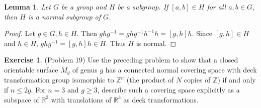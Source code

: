 \documentclass[12pt, psamsfonts]{amsart}
\newtheorem{lem}[thm]{Lemma}
\theoremstyle{definition}
\newtheorem*{exer}{Exercise}
\theoremstyle{remark}
\numberwithin{equation}{section}
\begin{document}
\begin{lem}
  Let $G$ be a group and $H$ be a subgroup.
  If $[a, b] \in H$ for all $a, b \in G$, then $H$ is a normal subgroup of $G$.
\end{lem}

\begin{proof}
  Let $g \in G, h \in H$.
  Then $ghg^{-1} = ghg^{-1}h^{-1}h = [g, h]h$.
  Since $[g, h] \in H$ and $h \in H$, $ghg^{-1} = [g, h]h \in H$.
  Thus $H$ is normal.
\end{proof}

\begin{exer}{(Problem 19)}
  Use the preceding problem to show that a closed orientable surface $M_g$ of genus $g$ has a connected normal covering space with deck transformation group isomorphic to $\mathbb{Z}^n$ (the product of $N$ copies of $\mathbb{Z}$) if and only if $n \leq 2g$.
  For $n = 3$ and $g \geq 3$, describe such a covering space explicitly as a subspace of $\mathbb{R}^3$ with translations of $\mathbb{R}^3$ as deck transformations.
\end{exer}
\end{document}
